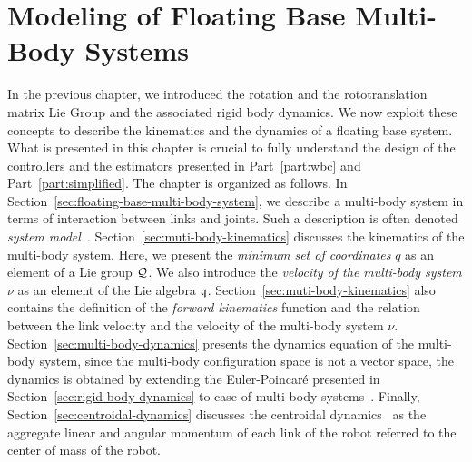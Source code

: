 
\chapter{Modeling of Floating Base Multi-Body Systems \label{chapter:floating_base_system_modeling}}  %

\ifpdf
    \graphicspath{{ChapterFloatingBaseSystemModeling/figures/Raster/}{ChapterFloatingBaseSystemModeling/figures/PDF/}{ChapterFloatingBaseSystemModeling/figures/}}
\else
    \graphicspath{{ChapterFloatingBaseSystemModeling/figures/Vector/}{ChapterFloatingBaseSystemModeling/figures/}}
\fi

In the previous chapter, we introduced the rotation and the rototranslation matrix Lie Group and the associated rigid body dynamics. We now exploit these concepts to describe the kinematics and the dynamics of a floating base system. 
What is presented in this chapter is crucial to fully understand the design of the controllers and the estimators presented in Part~\ref{part:wbc} and Part~\ref{part:simplified}.
The chapter is organized as follows. In Section~\ref{sec:floating-base-multi-body-system}, we describe a multi-body system in terms of interaction between links and joints. Such a description is often denoted \emph{system model}~\citep{Featherstone2014}. Section~\ref{sec:muti-body-kinematics} discusses the kinematics of the multi-body system. Here, we present the \emph{minimum set of coordinates} $q$ as an element of a Lie group $\mathcal{Q}$. We also introduce the \emph{velocity of the multi-body system} $\nu$ as an element of the Lie algebra $\mathfrak{q}$. Section~\ref{sec:muti-body-kinematics} also contains the definition of the \emph{forward kinematics} function and the relation between the link velocity and the velocity of the multi-body system $\nu$. Section~\ref{sec:multi-body-dynamics} presents the dynamics equation of the multi-body system, since the multi-body configuration space is not a vector space, the dynamics is obtained by extending the Euler-Poincar\'e presented in Section~\ref{sec:rigid-body-dynamics} to case of multi-body systems~\citep{Marsden2010}.
Finally, Section~\ref{sec:centroidal-dynamics} discusses the centroidal dynamics~\citep{Orin2013} as the aggregate linear and angular momentum of each link of the robot referred to the center of mass of the robot.








